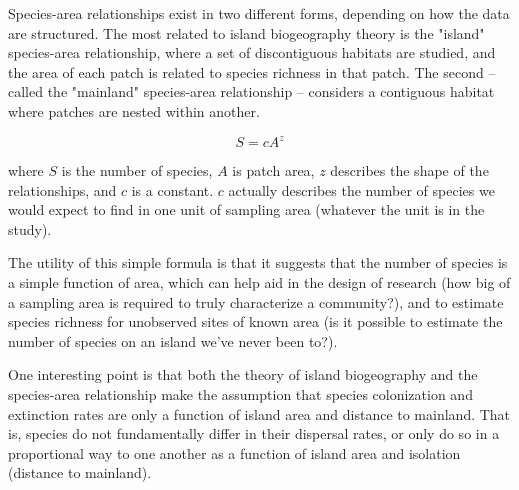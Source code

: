 \documentclass[12pt]{article}
\begin{document}
Species-area relationships exist in two different forms, depending on how the data are structured. The most related to island biogeography theory is the "island" species-area relationship, where a set of discontiguous habitats are studied, and the area of each patch is related to species richness in that patch. The second -- called the "mainland" species-area relationship -- considers a contiguous habitat where patches are nested within another.




\begin{equation}
S = cA^{z}
\end{equation}



where $S$ is the number of species, $A$ is patch area, $z$ describes the shape of the relationships, and $c$ is a constant. $c$ actually describes the number of species we would expect to find in one unit of sampling area (whatever the unit is in the study).  



The utility of this simple formula is that it suggests that the number of species is a simple function of area, which can help aid in the design of research (how big of a sampling area is required to truly characterize a community?), and to estimate species richness for unobserved sites of known area (is it possible to estimate the number of species on an island we've never been to?). 


One interesting point is that both the theory of island biogeography and the species-area relationship make the assumption that species colonization and extinction rates are only a function of island area and distance to mainland. That is, species do not fundamentally differ in their dispersal rates, or only do so in a proportional way to one another as a function of island area and isolation (distance to mainland). 

\end{document}

